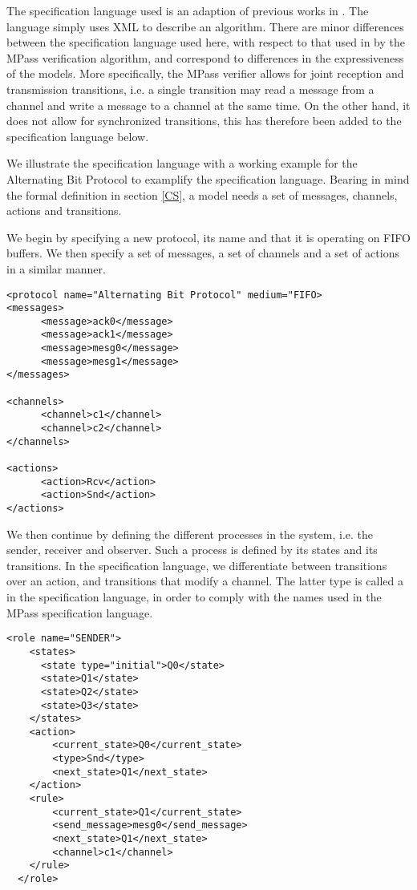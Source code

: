 The specification language used is an adaption of previous works in \cite{mpass}. The language simply uses XML to describe an algorithm. There are minor differences between the specification language used here, with respect to that used in by the MPass verification algorithm, and correspond to differences in the expressiveness of the models. More specifically, the MPass verifier allows for joint reception and transmission transitions, i.e. a single transition may read a message from a channel and write a message to a channel at the same time. On the other hand, it does not allow for synchronized transitions, this has therefore been added to the specification language below.

\begin{exmp}
We illustrate the specification language with a working example for the Alternating Bit Protocol to examplify the specification language. Bearing in mind the formal definition in section \ref{CS}, a model needs a set of messages, channels, actions and transitions.

We begin by specifying a new protocol, its name and that it is operating on FIFO buffers. We then specify a set of messages, a set of channels and a set of actions in a similar manner.

\begin{lstlisting}[frame=single, showstringspaces=false]
<protocol name="Alternating Bit Protocol" medium="FIFO>
<messages>
      <message>ack0</message>
      <message>ack1</message>
      <message>mesg0</message>
      <message>mesg1</message>
</messages>

<channels>
      <channel>c1</channel>
      <channel>c2</channel>
</channels>

<actions>
      <action>Rcv</action>
      <action>Snd</action>
</actions>
\end{lstlisting}

We then continue by defining the different processes in the system, i.e. the sender, receiver and observer. Such a process is defined by its states and its transitions. In the specification language, we differentiate between transitions over an action, and transitions that modify a channel. The latter type is called a  in the specification language, in order to comply with the names used in the MPass specification language.

\begin{lstlisting}[frame=single]
  <role name="SENDER">
    <states>
      <state type="initial">Q0</state>
      <state>Q1</state>
      <state>Q2</state>
      <state>Q3</state>
    </states>
    <action>
        <current_state>Q0</current_state>
        <type>Snd</type>
        <next_state>Q1</next_state>
    </action>
    <rule>
        <current_state>Q1</current_state>
        <send_message>mesg0</send_message>
        <next_state>Q1</next_state>
        <channel>c1</channel>
    </rule>
  </role>
\end{lstlisting}


\end{exmp}
